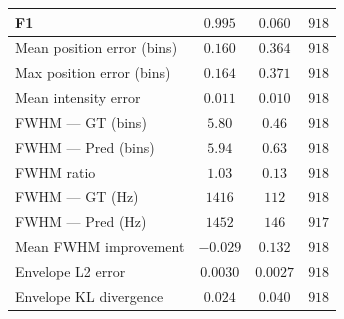 \documentclass[12pt,a4paper]{report}
\begin{document}
\begin{table}[H]
\begin{tabular}{@{}lccc@{}}
    F1                       & $0.995$  & $0.060$  & $918$ \\
    \midrule
    Mean position error (bins) & $0.160$ & $0.364$ & $918$ \\
    Max position error (bins)  & $0.164$ & $0.371$ & $918$ \\
    Mean intensity error       & $0.011$ & $0.010$ & $918$ \\
    \midrule
    FWHM --- GT (bins)       & $5.80$   & $0.46$  & $918$ \\
    FWHM --- Pred (bins)     & $5.94$   & $0.63$  & $918$ \\
    FWHM ratio               & $1.03$   & $0.13$  & $918$ \\
    FWHM --- GT (Hz)         & $1416$   & $112$   & $918$ \\
    FWHM --- Pred (Hz)       & $1452$   & $146$   & $917$ \\
    Mean FWHM improvement     & $-0.029$ & $0.132$ & $918$ \\
    \midrule
    Envelope L2 error        & $0.0030$ & $0.0027$ & $918$ \\
    Envelope KL divergence   & $0.024$  & $0.040$  & $918$ \\
    \bottomrule
  \end{tabular}
\end{table}
\end{document}
